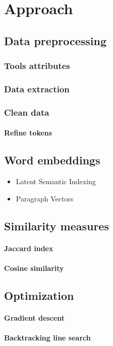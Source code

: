 \chapter{Approach}\label{chap:approach}
\section{Data preprocessing}
    \subsection{ Tools attributes}
    \subsection{Data extraction}
    \subsection{Clean data}
    \subsubsection{Refine tokens}
\section{Word embeddings}
        \begin{itemize}
            \item Latent Semantic Indexing
            \item Paragraph Vectors
        \end{itemize}

\section{Similarity measures}
    \subsubsection{Jaccard index}
    \subsubsection{Cosine similarity}

\section{Optimization}
    \subsubsection{Gradient descent}
    \subsubsection{Backtracking line search}